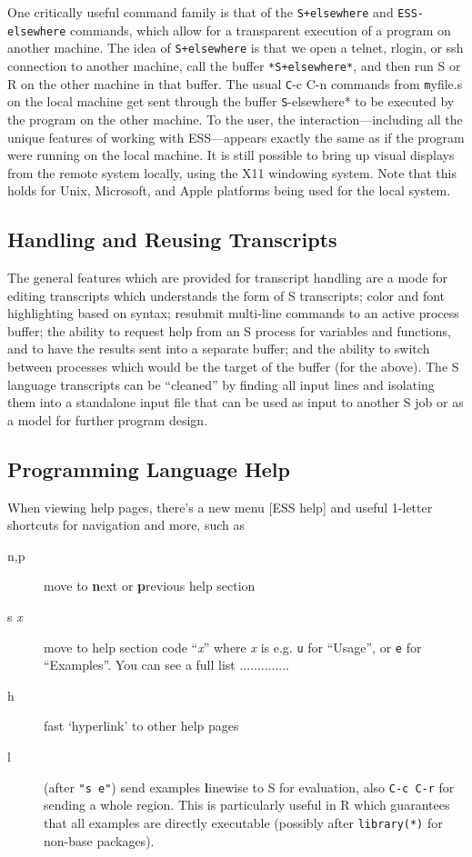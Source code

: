 \documentclass{article}
\begin{document}
One critically useful command family is that of the \verb|S+elsewhere|
and \verb|ESS-elsewhere| commands, which allow for a transparent
execution of a program on another machine.  The idea of
\verb|S+elsewhere| is that we open a telnet, rlogin, or ssh connection
to another machine, call the buffer \verb|*S+elsewhere*|, and then run
S or R on the other machine in that buffer.  The usual {\texttt C-c C-n}
commands from {\texttt myfile.s} on the local machine get sent through the
buffer {\texttt *S-elsewhere*} to be executed by the program on the other
machine.  To the user, the interaction---including all the unique
features of working with ESS---appears exactly the same as if the
program were running on the local machine.  It is still possible to
bring up visual displays from the remote system locally, using the X11
windowing system.  Note that this holds for Unix, Microsoft, and Apple
platforms being used for the local system.

\subsection{Handling and Reusing Transcripts}
\label{sec:S:trans}

The general features which are provided for transcript handling are a
mode for editing transcripts which understands the form of S
transcripts; color and font highlighting based on syntax; resubmit
multi-line commands to an active process buffer; the ability to
request help from an S process for variables and functions, and to
have the results sent into a separate buffer; and the ability to
switch between processes which would be the target of the buffer (for
the above).  The S language transcripts can be ``cleaned'' by
finding all input lines and isolating them into a standalone input file
that can be used as input to another S job or as a model for further
program design.


\subsection{Programming Language Help}
\label{sec:S:help}
When viewing help pages, there's a new menu \textsf{[ESS help]} and
useful 1-letter shortcuts for navigation and more, such as
\begin{description}
\item[n,p] move to \textbf{n}ext or \textbf{p}revious help section
\item[s \textit{x}] move to help section code ``\textit{x}'' where
  \textit{x} is e.g. \texttt{u} for ``Usage'', or \texttt{e} for
  ``Examples''.  You can see a full list ..............
\item[h] fast `hyperlink' to other help pages
\item[l] (after \texttt{"s e"}) send examples \textbf{l}inewise to S for
  evaluation, also \texttt{C-c C-r} for sending a whole region.  This 
  is particularly useful in R which guarantees that all examples are
  directly executable (possibly after \texttt{library(*)} for non-base
  packages).
\end{description}
\end{document}
